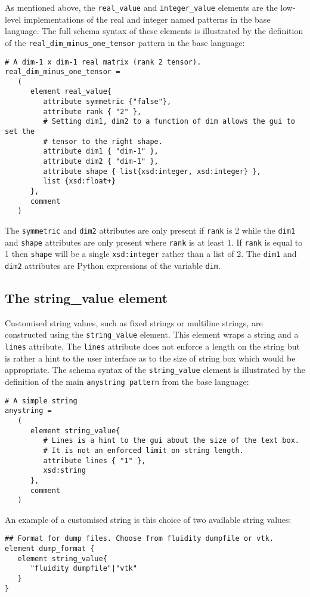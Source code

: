 \documentclass[a4paper, 11pt]{book}
\begin{document}
As mentioned above, the \verb+real_value+ and \verb+integer_value+
elements are the low-level implementations of the real and integer named
patterns in the base language. The full schema syntax of these elements is
illustrated by the definition of the \verb+real_dim_minus_one_tensor+
pattern in the base language:
\begin{lstlisting}
# A dim-1 x dim-1 real matrix (rank 2 tensor).
real_dim_minus_one_tensor =
   (
      element real_value{
         attribute symmetric {"false"},
         attribute rank { "2" },
         # Setting dim1, dim2 to a function of dim allows the gui to set the
         # tensor to the right shape.
         attribute dim1 { "dim-1" },
         attribute dim2 { "dim-1" },
         attribute shape { list{xsd:integer, xsd:integer} },
         list {xsd:float+}
      },
      comment
   )
\end{lstlisting}
The \lstinline+symmetric+ and \lstinline+dim2+ attributes are only present
if \lstinline+rank+ is 2 while the \lstinline+dim1+ and \lstinline+shape+
attributes are only present where \lstinline+rank+ is at least 1. If
\lstinline+rank+ is equal to 1 then \lstinline+shape+ will be a single
\lstinline+xsd:integer+ rather than a list of 2. The \lstinline+dim1+ and
\lstinline+dim2+ attributes are Python expressions of the variable
\lstinline+dim+.


\subsection{The string\_value element}

Customised string values, such as fixed strings or multiline strings, are
constructed using the \lstinline+string_value+ element. This element wraps a
string and a \lstinline+lines+ attribute. The \lstinline+lines+ attribute
does not enforce a length on the string but is rather a hint to the user
interface as to the size of string box which would be appropriate. The
schema syntax of the \lstinline+string_value+ element is illustrated by the
definition of the main \lstinline+anystring pattern+ from the base language:
\begin{lstlisting}
# A simple string
anystring =
   (
      element string_value{
         # Lines is a hint to the gui about the size of the text box.
         # It is not an enforced limit on string length.
         attribute lines { "1" },
         xsd:string
      },
      comment
   )
\end{lstlisting}
An example of a customised string is this choice of two available string
values:
\begin{lstlisting}
## Format for dump files. Choose from fluidity dumpfile or vtk.
element dump_format {
   element string_value{
      "fluidity dumpfile"|"vtk"
   }
}  
\end{lstlisting}
\end{document}
